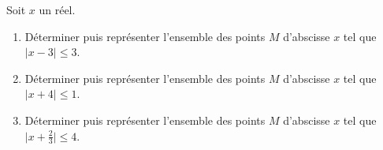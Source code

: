 
Soit $x$ un réel.   


\begin{enumerate}
	\item Déterminer puis représenter l'ensemble des points $M$ d'abscisse $x$ tel que $\vert x- 3 \vert \leq 3$.
	\item Déterminer puis représenter l'ensemble des points $M$ d'abscisse $x$ tel que $\vert x+4 \vert \leq 1$.
	\item Déterminer puis représenter l'ensemble des points $M$ d'abscisse $x$ tel que $\vert x+\frac{2}{3} \vert \leq 4$.
\end{enumerate}
